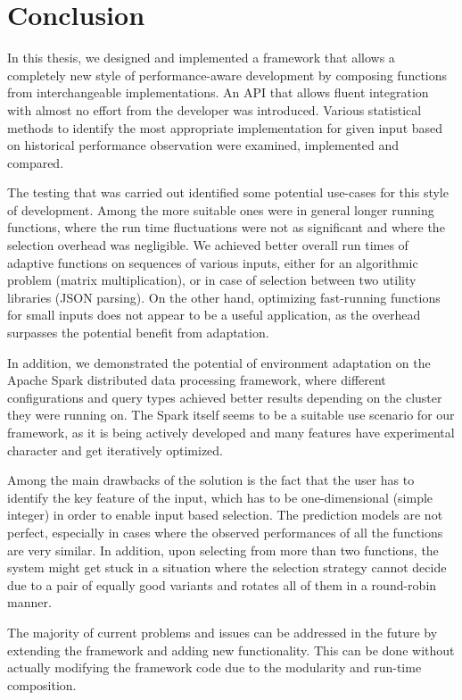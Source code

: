 \chapter*{Conclusion}

In this thesis, we designed and implemented a framework that allows a completely new style of performance-aware development by composing functions from interchangeable implementations. An API that allows fluent integration with almost no effort from the developer was introduced. Various statistical methods to identify the most appropriate implementation for given input based on historical performance observation were examined, implemented and compared.

The testing that was carried out identified some potential use-cases for this style of development. Among the more suitable ones were in general longer running functions, where the run time fluctuations were not as significant and where the selection overhead was negligible. We achieved better overall run times of adaptive functions on sequences of various inputs, either for an algorithmic problem (matrix multiplication), or in case of selection between two utility libraries (JSON parsing). On the other hand, optimizing fast-running functions for small inputs does not appear to be a useful application, as the overhead surpasses the potential benefit from adaptation.

In addition, we demonstrated the potential of environment adaptation on the Apache Spark distributed data processing framework, where different configurations and query types achieved better results depending on the cluster they were running on. The Spark itself seems to be a suitable use scenario for our framework, as it is being actively developed and many features have experimental character and get iteratively optimized.

Among the main drawbacks of the solution is the fact that the user has to identify the key feature of the input, which has to be one-dimensional (simple integer) in order to enable input based selection. The prediction models are not perfect, especially in cases where the observed performances of all the functions are very similar. In addition, upon selecting from more than two functions, the system might get stuck in a situation where the selection strategy cannot decide due to a pair of equally good variants and rotates all of them in a round-robin manner.

The majority of current problems and issues can be addressed in the future by extending the framework and adding new functionality. This can be done without actually modifying the framework code due to the modularity and run-time composition.

